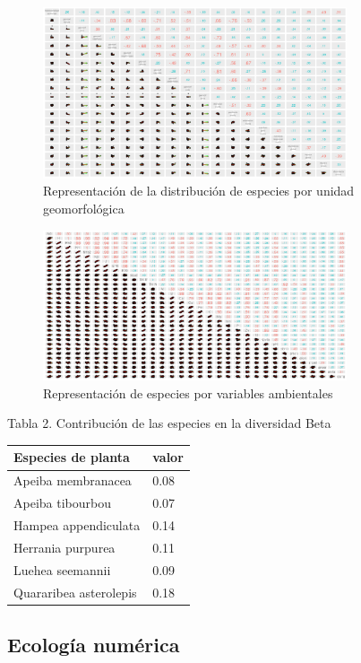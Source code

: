 \documentclass[11pt,]{article}
\begin{document}
\begin{figure}
\centering
\includegraphics[width=0.80000\textwidth]{matriz_correlacion_geomorf_abun_riq_spearman.png}
\caption{Representación de la distribución de especies por unidad
geomorfológica}
\end{figure}

\begin{figure}
\centering
\includegraphics[width=0.80000\textwidth]{Representacion_especies_variables_ambientales.png}
\caption{Representación de especies por variables ambientales}
\end{figure}

Tabla 2. Contribución de las especies en la diversidad Beta

\begin{longtable}[]{@{}ll@{}}
\toprule
Especies de planta & valor\tabularnewline
\midrule
\endhead
Apeiba membranacea & 0.08\tabularnewline
Apeiba tibourbou & 0.07\tabularnewline
Hampea appendiculata & 0.14\tabularnewline
Herrania purpurea & 0.11\tabularnewline
Luehea seemannii & 0.09\tabularnewline
Quararibea asterolepis & 0.18\tabularnewline
\bottomrule
\end{longtable}

\subsection{Ecología numérica}\label{ecologuxeda-numuxe9rica}
\end{document}
